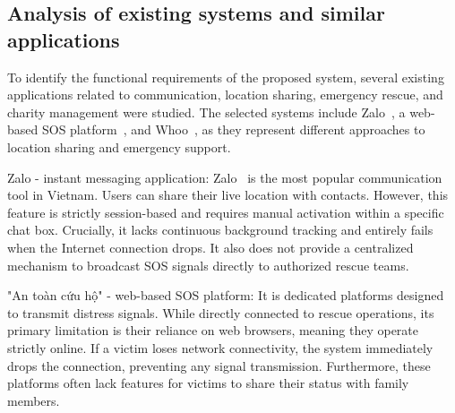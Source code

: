 \documentclass[../Main.tex]{subfiles}
\begin{document}

\subsection{Analysis of existing systems and similar applications}
\label{subsection:2.1.1}

To identify the functional requirements of the proposed system, several existing applications related to communication, location sharing, emergency rescue, and charity management were studied. The selected systems include Zalo~\cite{zaloapp}, a web-based SOS platform~\cite{antoanmualu}, and Whoo~\cite{whooapp}, as they represent different approaches to location sharing and emergency support.

Zalo - instant messaging application: Zalo~\cite{zaloapp} is the most popular communication tool in Vietnam. Users can share their live location with contacts. However, this feature is strictly session-based and requires manual activation within a specific chat box. Crucially, it lacks continuous background tracking and entirely fails when the Internet connection drops. It also does not provide a centralized mechanism to broadcast SOS signals directly to authorized rescue teams.

"An toàn cứu hộ" - web-based SOS platform: It is dedicated platforms designed to transmit distress signals. While directly connected to rescue operations, its primary limitation is their reliance on web browsers, meaning they operate strictly online. If a victim loses network connectivity, the system immediately drops the connection, preventing any signal transmission. Furthermore, these platforms often lack features for victims to share their status with family members.
\end{document}
